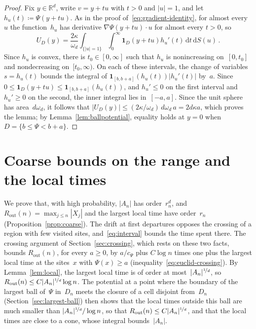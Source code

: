 \documentclass[11pt]{amsart}
\theoremstyle{plain}
\theoremstyle{definition}
\newcommand{\R}{\mathbb R}
\newcommand{\drift}{\kappa}
\newcommand{\gauge}{\Psi}
\newcommand{\ind}{\mathbf 1}
\newcommand{\dd}{\,\mathrm d}
\newcommand{\nf}{\nicefrac}
\newcommand{\Rout}{R_{\mathrm{out}}}
\numberwithin{equation}{section}
\begin{document}
\begin{proof}
Fix $y\in\R^d$, write $v=y+tu$ with $t>0$ and $|u|=1$, and let $h_u(t)\coloneqq \gauge(y+tu)$. As in the proof of~\eqref{eq:gradient-identity}, for almost every~$u$ the function~$h_u$ has derivative $\nabla \gauge(y+tu)\cdot u$ for almost every $t>0$, so
\begin{equation*}
U_D(y)=\frac{2\drift}{\omega_d}\int_{\{|u|=1\}}\int_0^\infty\ind_D(y+tu)h_u'(t)\dd t\dd S(u)\, .
\end{equation*}
Since $h_u$ is convex, there is $t_0\in[0,\infty]$ such that $h_u$ is nonincreasing on~$[0,t_0]$ and nondecreasing on~$[t_0,\infty)$. On each of these intervals, the change of variables $s=h_u(t)$ bounds the integral of $\ind_{[b,b+a]}(h_u(t))|h_u'(t)|$ by~$a$. Since $0\leq\ind_D(y+tu)\leq\ind_{[b,b+a]}(h_u(t))$, and $h_u'\leq0$ on the first interval and $h_u'\geq0$ on the second, the inner integral lies in~$[-a,a]$. Since the unit sphere has area~$d\omega_d$, it follows that $|U_D(y)|\leq(2\drift/\omega_d)\,d\omega_d\,a=2d\drift a$, which proves the lemma; by Lemma~\ref{lem:ballpotential}, equality holds at $y=0$ when $D=\{b\leq \gauge<b+a\}$.
\end{proof}

\section{Coarse bounds on the range and the local times}\label{sec:coarse}

We prove that, with high probability, $|A_n|$ has order~$r_n^d$, and $\Rout(n)=\max_{j\leq n}|X_j|$ and the largest local time have order~$r_n$ (Proposition~\ref{prop:coarse}). The drift at first departures opposes the crossing of a region with few visited sites, and~\eqref{eq:interval} bounds the time spent there. The crossing argument of Section~\ref{sec:crossing}, which rests on these two facts, bounds $\Rout(n)$, for every $a\geq0$, by $a/c_\gauge$ plus $C\log n$ times one plus the largest local time at the sites~$x$ with $\gauge(x)\geq a$ (inequality~\eqref{eq:euclid-crossing}). By Lemma~\ref{lem:local}, the largest local time is of order at most~$|A_n|^{\nf1d}$, so $\Rout(n)\leq C|A_n|^{\nf1d}\log n$. The potential at a point where the boundary of the largest ball of~$\gauge$ in~$D_n$ meets the closure of a cell disjoint from~$D_n$ (Section~\ref{sec:largest-ball}) then shows that the local times outside this ball are much smaller than $|A_n|^{\nf1d}/\log n$, so that $\Rout(n)\leq C|A_n|^{\nf1d}$, and that the local times are close to a cone, whose integral bounds~$|A_n|$.
\end{document}
